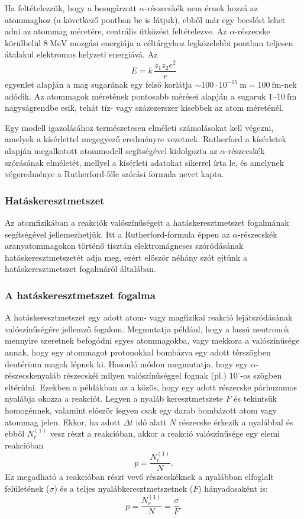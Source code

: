 \documentclass[../main.tex]{subfiles}
\begin{document}
Ha feltételezzük, hogy a besugárzott $\alpha$-részecskék nem érnek
hozzá az atommaghoz (a következő pontban be is látjuk), ebből már egy
becslést lehet adni az atommag méretére, centrális ütközést feltételezve.
Az $\alpha$-részecske körülbelül $8\ \mathrm{MeV}$ mozgási energiája a
céltárgyhoz legközelebbi pontban teljesen átalakul elektromos helyzeti
energiává.
Az
\[
E = k\,\frac{z_1 z_2 e^2}{r}
\]
egyenlet alapján a mag sugarának egy felső korlátja
$\sim 100\cdot 10^{-15}\ \mathrm{m} = 100\ \mathrm{fm}$-nek adódik.
Az atommagok méretének pontosabb mérései alapján a sugaruk
$1$--$10\ \mathrm{fm}$ nagyságrendbe esik, tehát tíz- vagy
százezerszer kisebbek az atom méreténél.

Egy modell igazolásához természetesen elméleti számolásokat kell végezni,
amelyek a kísérlettel megegyező eredményre vezetnek.
Rutherford a kísérletek alapján megalkotott atommodell segítségével
kidolgozta az $\alpha$-részecskék szórásának elméletét, mellyel a
kísérleti adatokat sikerrel írta le, és amelynek végeredménye a
Rutherford-féle szórási formula nevet kapta.

\subsubsection{Hatáskeresztmetszet}
Az atomfizikában a reakciók valószínűségeit a hatáskeresztmetszet
fogalmának segítségével jellemezhetjük.
Itt a Rutherford-formula éppen az $\alpha$-részecskék aranyatommagokon
történő tisztán elektromágneses szóródásának hatáskeresztmetszetét adja
meg, ezért először néhány szót ejtünk a hatáskeresztmetszet fogalmáról
általában.

\subsubsection*{A hatáskeresztmetszet fogalma}
A hatáskeresztmetszet egy adott atom- vagy magfizikai reakció
lejátszódásának valószínűségére jellemző fogalom.
Megmutatja például, hogy a lassú neutronok mennyire szeretnek befogódni
egyes atommagokba, vagy mekkora a valószínűsége annak, hogy egy
atommagot protonokkal bombázva egy adott térszögben deutérium magok
lépnek ki.
Hasonló módon megmutatja, hogy egy $\alpha$-részecskenyaláb részecskéi
milyen valószínűséggel fognak (pl.) $10^\circ$-os szögben eltérülni.
Ezekben a példákban az a közös, hogy egy adott részecske párhuzamos
nyalábja okozza a reakciót.
Legyen a nyaláb keresztmetszete $F$ és tekintsük homogénnek, valamint
először legyen csak egy darab bombázott atom vagy atommag jelen.
Ekkor, ha adott $\Delta t$ idő alatt $N$ részecske érkezik a nyalábbal
és ebből $N_r^{(1)}$ vesz részt a reakcióban, akkor a reakció
valószínűsége egy elemi reakcióban
\[
p=\frac{N_r^{(1)}}{N}.
\]
Ez megadható a reakcióban részt vevő részecskéknek a nyalábban
elfoglalt felületének ($\sigma$) és a teljes nyalábkeresztmetszetnek
($F$) hányadosaként is:
\[
p=\frac{N_r^{(1)}}{N}=\frac{\sigma}{F}.
\]
\end{document}

